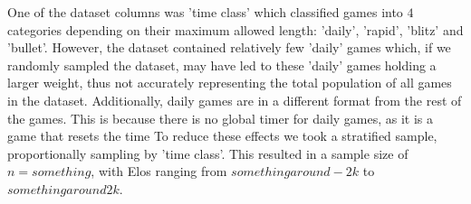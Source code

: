 \documentclass[10pt,a4paper]{article}
\begin{document}
\begin{multicols}{2}
One of the dataset columns was 'time class' which classified games into $4$ categories depending on their maximum allowed length: 'daily', 'rapid', 'blitz' and 'bullet'. However, the dataset contained relatively few 'daily' games which, if we randomly sampled the dataset, may have led to these 'daily' games holding a larger weight, thus not accurately representing the total population of all games in the dataset. Additionally, daily games are in a different format from the rest of the games. This is because there is no global timer for daily games, as it is a game that resets the time
To reduce these effects we took a stratified sample, proportionally sampling by 'time class'. This resulted in a sample size of $n={something}$, with Elos ranging from ${something around -2k}$ to ${something around 2k}$. \newline


\end{multicols}
\end{document}
